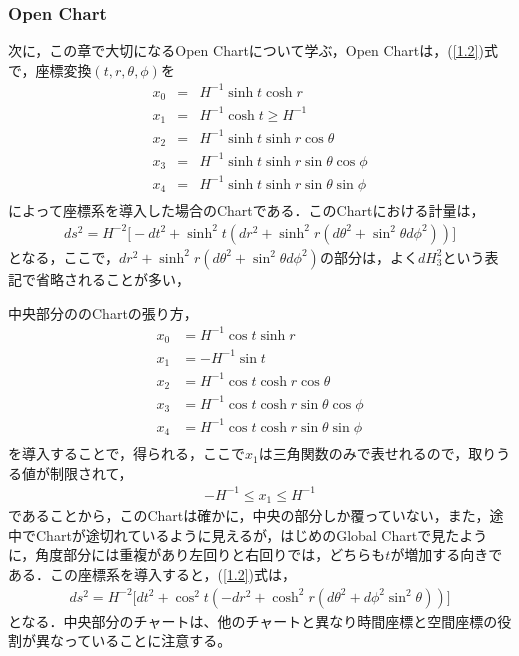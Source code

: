 \subsubsection{Open Chart}
次に，この章で大切になるOpen Chartについて学ぶ，Open Chartは，(\ref{1.2})式で，座標変換$(t,r,\theta,\phi)$を
\begin{eqnarray}
  x_0&=&H^{-1}\sinh{t}\cosh{r} \\
  x_1&=&H^{-1}\cosh{t} \geqslant H^{-1} \\
  x_2&=&H^{-1}\sinh{t}\sinh{r}\cos{\theta} \\
  x_3&=&H^{-1}\sinh{t}\sinh{r}\sin{\theta}\cos{\phi} \\
  x_4&=&H^{-1}\sinh{t}\sinh{r}\sin{\theta}\sin{\phi} \\
\end{eqnarray}
によって座標系を導入した場合のChartである．このChartにおける計量は，
\begin{eqnarray}
\label{openM}
      ds^2=H^{-2}\biggr[-dt^2+\sinh^2{t}(dr^2+\sinh^2r(d\theta^2+\sin^2\theta d\phi^2))\biggr]
\end{eqnarray}
となる，ここで，$dr^2+\sinh^2r(d\theta^2+\sin^2\theta d\phi^2)$の部分は，よく$dH_3^2$という表記で省略されることが多い，

中央部分ののChartの張り方，
\begin{align}
  \label{1.19}
  x_0&=H^{-1}\cos{t}\sinh{r} \\
  \label{test}
  x_1&=-H^{-1}\sin{t} \\
  x_2&=H^{-1}\cos{t}\cosh{r}\cos{\theta} \\
  x_3&=H^{-1}\cos{t}\cosh{r}\sin{\theta}\cos{\phi} \\
  x_4&=H^{-1}\cos{t}\cosh{r}\sin{\theta}\sin{\phi} \\
\end{align}
を導入することで，得られる，ここで$x_1$は三角関数のみで表せれるので，取りうる値が制限されて，
\begin{align}
  -H^{-1} \leqslant x_1 \leqslant H^{-1}
\end{align}
であることから，このChartは確かに，中央の部分しか覆っていない，また，途中でChartが途切れているように見えるが，はじめのGlobal Chartで見たように，角度部分には重複があり左回りと右回りでは，どちらも$t$が増加する向きである．この座標系を導入すると，(\ref{1.2})式は，
\begin{align}
\label{CenterM}
  ds^2=H^{-2}\biggl[dt^2+\cos^2t(-dr^2+\cosh^2r(d\theta^2+d\phi^2\sin^2\theta))\biggr]
\end{align}
となる．中央部分のチャートは、他のチャートと異なり時間座標と空間座標の役割が異なっていることに注意する。

